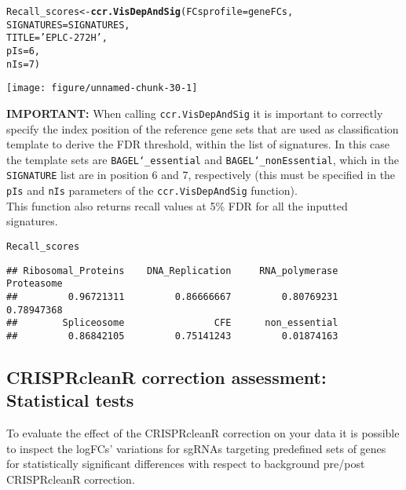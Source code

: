 \documentclass{article}\usepackage[]{graphicx}\usepackage[]{color}
\makeatletter
\def\maxwidth{ %
  \ifdim\Gin@nat@width>\linewidth
    \linewidth
  \else
    \Gin@nat@width
  \fi
}
\newcommand{\hlnum}[1]{\textcolor[rgb]{0.686,0.059,0.569}{#1}}%
\newcommand{\hlstr}[1]{\textcolor[rgb]{0.192,0.494,0.8}{#1}}%
\newcommand{\hlstd}[1]{\textcolor[rgb]{0.345,0.345,0.345}{#1}}%
\newcommand{\hlkwb}[1]{\textcolor[rgb]{0.69,0.353,0.396}{#1}}%
\newcommand{\hlkwc}[1]{\textcolor[rgb]{0.333,0.667,0.333}{#1}}%
\newcommand{\hlkwd}[1]{\textcolor[rgb]{0.737,0.353,0.396}{\textbf{#1}}}%
\newenvironment{kframe}{%
 \def\at@end@of@kframe{}%
 \ifinner\ifhmode%
  \def\at@end@of@kframe{\end{minipage}}%
  \begin{minipage}{\columnwidth}%
 \fi\fi%
 \def\FrameCommand##1{\hskip\@totalleftmargin \hskip-\fboxsep
 \colorbox{shadecolor}{##1}\hskip-\fboxsep
     \hskip-\linewidth \hskip-\@totalleftmargin \hskip\columnwidth}%
 \MakeFramed {\advance\hsize-\width
   \@totalleftmargin\z@ \linewidth\hsize
   \@setminipage}}%
 {\par\unskip\endMakeFramed%
 \at@end@of@kframe}
\newenvironment{knitrout}{}{} %
\makeatother
\begin{document}
\begin{knitrout}
\color{fgcolor}\begin{kframe}
\begin{alltt}
\hlstd{Recall_scores}\hlkwb{<-}\hlkwd{ccr.VisDepAndSig}\hlstd{(}\hlkwc{FCsprofile} \hlstd{= geneFCs,}
                             \hlkwc{SIGNATURES} \hlstd{= SIGNATURES,}
                             \hlkwc{TITLE} \hlstd{=} \hlstr{'EPLC-272H'}\hlstd{,}
                             \hlkwc{pIs} \hlstd{=} \hlnum{6}\hlstd{,}
                             \hlkwc{nIs} \hlstd{=} \hlnum{7}\hlstd{)}
\end{alltt}
\end{kframe}

{\centering \texttt{[image: figure/unnamed-chunk-30-1]} 

}



\end{knitrout}
%
\textbf{IMPORTANT:} When calling \texttt{ccr.VisDepAndSig} it is important to correctly specify the index position of the reference gene sets that are used as classification template to derive the FDR threshold, within the list of signatures. In this case the template sets are \texttt{BAGEL\char`_essential} and \texttt{BAGEL\char`_nonEssential}, which in the \texttt{SIGNATURE} list are in position 6 and 7, respectively (this must be specified in the \texttt{pIs} and \texttt{nIs} parameters of the \texttt{ccr.VisDepAndSig} function).\\
%
This function also returns recall values at 5\% FDR for all the inputted signatures.

\begin{knitrout}
\color{fgcolor}\begin{kframe}
\begin{alltt}
\hlstd{Recall_scores}
\end{alltt}
\begin{verbatim}
## Ribosomal_Proteins    DNA_Replication     RNA_polymerase         Proteasome 
##         0.96721311         0.86666667         0.80769231         0.78947368 
##        Spliceosome                CFE      non_essential 
##         0.86842105         0.75141243         0.01874163
\end{verbatim}
\end{kframe}
\end{knitrout}

\subsection{CRISPRcleanR correction assessment: Statistical tests}
To evaluate the effect of the CRISPRcleanR correction on your data it is possible to inspect the logFCs' variations for sgRNAs targeting predefined sets of genes for statistically significant differences with respect to background pre/post CRISPRcleanR correction.\\
\end{document}
